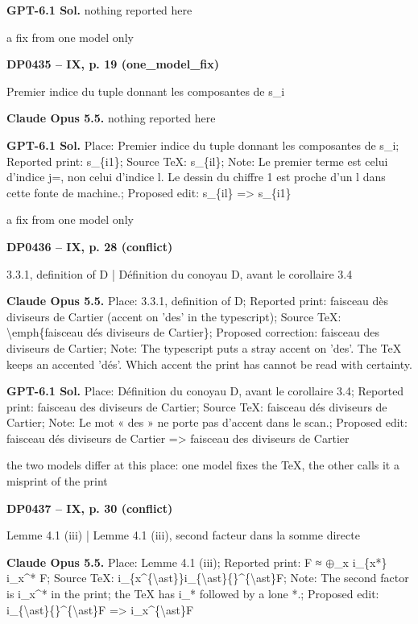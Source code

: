 \textbf{GPT-6.1 Sol.} nothing reported here\par
a fix from one model only\par
\par\noindent\hypertarget{DP0435}{}\textbf{DP0435 -- IX, p. 19 (one\_model\_fix)}\par
Premier indice du tuple donnant les composantes de s\_i\par
\textbf{Claude Opus 5.5.} nothing reported here\par
\textbf{GPT-6.1 Sol.} Place: Premier indice du tuple donnant les composantes de s\_i; Reported print: s\_\{i1\}; Source TeX: s\_\{il\}; Note: Le premier terme est celui d'indice j=, non celui d'indice l. Le dessin du chiffre 1 est proche d'un l dans cette fonte de machine.; Proposed edit: s\_\{il\} =\allowbreak > s\_\{i1\}\par
a fix from one model only\par
\par\noindent\hypertarget{DP0436}{}\textbf{DP0436 -- IX, p. 28 (conflict)}\par
3.3.1, definition of D | Définition du conoyau D, avant le corollaire 3.4\par
\textbf{Claude Opus 5.5.} Place: 3.3.1, definition of D; Reported print: faisceau dès diviseurs de Cartier (accent on 'des' in the typescript); Source TeX: \textbackslash{}emph\{faisceau dés diviseurs de Cartier\}; Proposed correction: faisceau des diviseurs de Cartier; Note: The typescript puts a stray accent on 'des'. The TeX keeps an accented 'dés'. Which accent the print has cannot be read with certainty.\par
\textbf{GPT-6.1 Sol.} Place: Définition du conoyau D, avant le corollaire 3.4; Reported print: faisceau des diviseurs de Cartier; Source TeX: faisceau dés diviseurs de Cartier; Note: Le mot « des » ne porte pas d'accent dans le scan.; Proposed edit: faisceau dés diviseurs de Cartier =\allowbreak > faisceau des diviseurs de Cartier\par
the two models differ at this place: one model fixes the TeX, the other calls it a misprint of the print\par
\par\noindent\hypertarget{DP0437}{}\textbf{DP0437 -- IX, p. 30 (conflict)}\par
Lemme 4.1 (iii) | Lemme 4.1 (iii), second facteur dans la somme directe\par
\textbf{Claude Opus 5.5.} Place: Lemme 4.1 (iii); Reported print: F ≈ \ensuremath{\oplus}\_x i\_\{x*\} i\_x\textasciicircum{}* F; Source TeX: i\_\{x\textasciicircum{}\{\textbackslash{}ast\}\}i\_\{\textbackslash{}ast\}\{\}\textasciicircum{}\{\textbackslash{}ast\}F; Note: The second factor is i\_x\textasciicircum{}* in the print; the TeX has i\_* followed by a lone *.; Proposed edit: i\_\{\textbackslash{}ast\}\{\}\textasciicircum{}\{\textbackslash{}ast\}F =\allowbreak > i\_x\textasciicircum{}\{\textbackslash{}ast\}F\par
